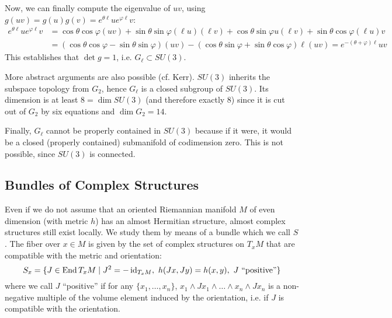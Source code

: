 \documentclass{scrartcl}
\begin{document}
\begin{myproof}
	\medskip
	
	Now, we can finally compute the eigenvalue of $uv$, using $g(uv)=g(u)g(v)=e^{\theta\ell}ue^{\varphi\ell}v$:
	\begin{align*}
		e^{\theta\ell}ue^{\varphi\ell}v
		&=\cos\theta\cos\varphi (uv)+\sin\theta\sin\varphi (\ell u)(\ell v)
		+\cos\theta \sin\varphi u(\ell v)+\sin\theta\cos\varphi (\ell u)v\\
		&=(\cos\theta\cos\varphi-\sin\theta\sin\varphi) (uv)-(\cos\theta\sin\varphi+\sin\theta\cos\varphi) \ell(uv)
		=e^{-(\theta+\varphi)\ell}uv
	\end{align*}
	This establishes that $\det g=1$, i.e. $G_\ell\subset SU(3)$.
	
	\medskip
	
	More abstract arguments are also possible (cf. Kerr). $SU(3)$ inherits the subspace topology from $G_2$, hence $G_\ell$ is a closed subgroup of $SU(3)$. Its dimension is at least $8=\dim SU(3)$ (and therefore exactly $8$) since it is cut out of $G_2$ by six equations and $\dim G_2=14$. 
	
	\medskip
	
	Finally, $G_\ell$ cannot be properly contained in $SU(3)$ because if it were, it would be a closed (properly contained) submanifold of codimension zero. This is not possible, since $SU(3)$ is connected.
\end{myproof}

\subsection{Bundles of Complex Structures}

Even if we do not assume that an oriented Riemannian manifold $M$ of even dimension (with metric $h$) has an almost Hermitian structure, almost complex structures still exist locally. We study them by means of a bundle which we call $S$. The fiber over $x\in M$ is given by the set of complex structures on $T_xM$ that are compatible with the metric and orientation:
\begin{equation*}
	S_x=\{J\in \End T_xM\mid J^2=-\id_{T_xM},\ h(Jx,Jy)=h(x,y),\ J\text{ ``positive''}\}
\end{equation*} 
where we call $J$ ``positive'' if for any $\{x_1,\dots,x_n\}$, $x_1\wedge Jx_1\wedge\dots\wedge x_n\wedge J x_n$ is a non-negative multiple of the volume element induced by the orientation, i.e. if $J$ is compatible with the orientation.

\medskip
\end{document}
